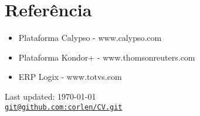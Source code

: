 \documentclass[letterpaper]{article}
\makeatletter
\def\footerlink{git@github.com:corlen/CV.git}
\makeatother
\begin{document}
\bigskip

\section*{Referência}

\begin{itemize}
\item Plataforma Calypso - www.calypso.com
\item Plataforma Kondor+ - www.thomsonreuters.com
\item ERP Logix - www.totvs.com
\end{itemize}

\bigskip

\begin{center}
  \begin{footnotesize}
    Last updated: \today \\
    \href{\footerlink}{\texttt{\footerlink}}
  \end{footnotesize}
\end{center}
\end{document}
